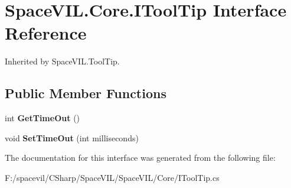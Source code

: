 \hypertarget{interface_space_v_i_l_1_1_core_1_1_i_tool_tip}{}\section{Space\+V\+I\+L.\+Core.\+I\+Tool\+Tip Interface Reference}
\label{interface_space_v_i_l_1_1_core_1_1_i_tool_tip}


Inherited by Space\+V\+I\+L.\+Tool\+Tip.

\subsection*{Public Member Functions}
\begin{DoxyCompactItemize}
\item 
\mbox{\label{interface_space_v_i_l_1_1_core_1_1_i_tool_tip_a73ee0bb241ccaf98612a0386492bcfbc}} 
int {\bfseries Get\+Time\+Out} ()
\item 
\mbox{\label{interface_space_v_i_l_1_1_core_1_1_i_tool_tip_ae01bc76b6ce59de09786bbc81696e6c7}} 
void {\bfseries Set\+Time\+Out} (int milliseconds)
\end{DoxyCompactItemize}


The documentation for this interface was generated from the following file\+:\begin{DoxyCompactItemize}
\item 
F\+:/spacevil/\+C\+Sharp/\+Space\+V\+I\+L/\+Space\+V\+I\+L/\+Core/I\+Tool\+Tip.\+cs\end{DoxyCompactItemize}
